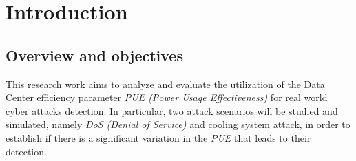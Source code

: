 \chapter{Introduction}

\begin{citazione}

\end{citazione}
\newpage

\section{Overview and objectives} 
This research work aims to analyze and evaluate the utilization of the Data Center efficiency parameter \emph{PUE (Power Usage Effectiveness)} for real world cyber attacks detection. In particular, two attack scenarios will be studied and simulated, namely \emph{DoS (Denial of Service)} and cooling system attack, in order to establish if there is a significant variation in the \emph{PUE} that leads to their detection. 


